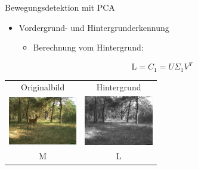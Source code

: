 \begin{frame}[t,fragile]{Bewegungsdetektion mit  PCA}
	\begin{itemize}
 \item Vordergrund- und Hintergrunderkennung
 \begin{itemize}
        \item{Berechnung vom Hintergrund:}
      \end{itemize}


{\large
\begin{equation}
\text{L}=C_1 = U\Sigma_1 V^T
\end{equation}
}
 
  \end{itemize}

  \vspace{0.01em}
  {
\begin{table}
\centering
        \begin{tabular}{cc}
        Originalbild  & Hintergrund \\
        \includegraphics[width=3cm]{images/Segmentierung/original-image}
         &
         \includegraphics[width=3cm]{images/Segmentierung/background-image}\\
M  & L \\
         \end{tabular}
        
\end{table}
 }
\end{frame}

